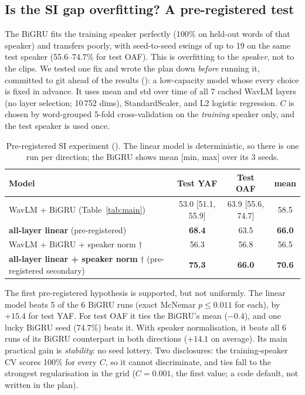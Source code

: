 \subsection{Is the SI gap overfitting? A pre-registered test}\label{sec:prereg}
The BiGRU fits the training speaker perfectly (100\% on held-out words of that speaker) and transfers poorly, with seed-to-seed swings of up to 19\pp{} on the same test speaker (55.6--74.7\% for test OAF).
This is overfitting to the \emph{speaker}, not to the clips.
We tested one fix and wrote the plan down \emph{before} running it, committed to git ahead of the results (): a low-capacity model whose every choice is fixed in advance.
It uses mean and std over time of all 7 cached WavLM layers (no layer selection; 10\,752 dims), StandardScaler, and L2 logistic regression.
$C$ is chosen by word-grouped 5-fold cross-validation on the \emph{training} speaker only, and the test speaker is used once.
\begin{table}[H]\centering\small
\caption[Study 1: linear model on pooled features]{Pre-registered SI experiment (). The linear model is deterministic, so there is one run per direction; the BiGRU shows mean [min, max] over its 3 seeds.}\label{tab:prereg}
\begin{tabular}{@{}lccc@{}}\toprule
Model & Test YAF & Test OAF & mean\\\midrule
WavLM + BiGRU (Table~\ref{tab:main}) & 53.0 [51.1, 55.9] & 63.9 [55.6, 74.7] & 58.5\\
\textbf{all-layer linear} (pre-registered) & \textbf{68.4} & 63.5 & \textbf{66.0}\\\midrule
WavLM + BiGRU + speaker norm $\dagger$ & 56.3 & 56.8 & 56.5\\
\textbf{all-layer linear + speaker norm} $\dagger$ (pre-registered secondary) & \textbf{75.3} & \textbf{66.0} & \textbf{70.6}\\\bottomrule
\end{tabular}\end{table}
The first pre-registered hypothesis is supported, but not uniformly.
The linear model beats 5 of the 6 BiGRU runs (exact McNemar $p\le0.011$ for each), by $+15.4$\pp{} for test YAF. For test OAF it ties the BiGRU's mean ($-0.4$\pp), and one lucky BiGRU seed (74.7\%) beats it.
With speaker normalisation, it beats all 6 runs of its BiGRU counterpart in both directions ($+14.1$\pp{} on average).
Its main practical gain is \emph{stability}: no seed lottery.
Two disclosures: the training-speaker CV scores 100\% for every $C$, so it cannot discriminate, and ties fall to the strongest regularisation in the grid ($C=0.001$, the first value; a code default, not written in the plan).
